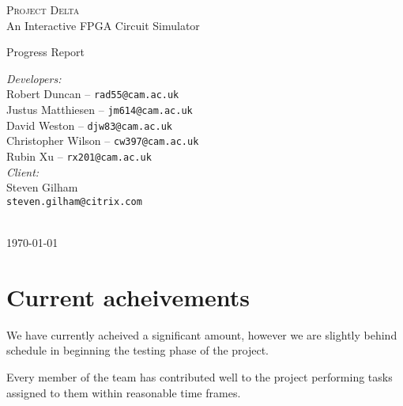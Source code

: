 \documentclass[12pt, a4paper, oneside,titlepage]{article}
\begin{document}
 \begin{titlepage}
 \begin{center}
 \textsc{\huge{Project Delta}} \\
 {\Large{An Interactive FPGA Circuit Simulator}}
\end{center}
\vspace{10em}
 \begin{center}
{\huge{Progress Report}}
\end{center}
\vfill
\setlength{\columnsep}{10em}
\begin{multicols}{2}{
\emph{Developers:}\\
Robert Duncan -- \texttt{rad55@cam.ac.uk} \\
Justus Matthiesen -- \texttt{jm614@cam.ac.uk}\\
David Weston -- \texttt{djw83@cam.ac.uk}\\
Christopher Wilson -- \texttt{cw397@cam.ac.uk}\\
Rubin Xu -- \texttt{rx201@cam.ac.uk}\\
\emph{Client:}\\
Steven Gilham\\
\texttt{steven.gilham@citrix.com}
\\
\\
}
\end{multicols}
\begin{center}
\today
\end{center}
 \end{titlepage}

\tableofcontents
\newpage
\setlength{\parskip}{\medskipamount}
\section{Current acheivements}
We have currently acheived a significant amount, however we are slightly behind schedule in beginning the testing phase of the project. 

Every member of the team has contributed well to the project performing tasks assigned to them within reasonable time frames.
\end{document}
